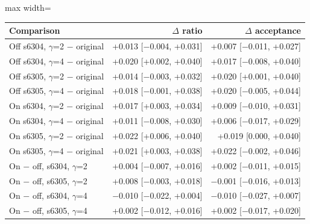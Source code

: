 \scriptsize
\setlength{\tabcolsep}{3.5pt}
\label{tab:t3boot}
\begin{adjustbox}{max width=\linewidth}
\begin{tabular}{lrr}
\toprule
Comparison & $\Delta$ ratio & $\Delta$ acceptance \\
\midrule
Off s6304, $\gamma$=2 $-$ original & +0.013 [$-$0.004, +0.031] & +0.007 [$-$0.011, +0.027] \\
Off s6304, $\gamma$=4 $-$ original & +0.020 [+0.002, +0.040] & +0.017 [$-$0.008, +0.040] \\
Off s6305, $\gamma$=2 $-$ original & +0.014 [$-$0.003, +0.032] & +0.020 [+0.001, +0.040] \\
Off s6305, $\gamma$=4 $-$ original & +0.018 [$-$0.001, +0.038] & +0.020 [$-$0.005, +0.044] \\
On s6304, $\gamma$=2 $-$ original & +0.017 [+0.003, +0.034] & +0.009 [$-$0.010, +0.031] \\
On s6304, $\gamma$=4 $-$ original & +0.011 [$-$0.008, +0.030] & +0.006 [$-$0.017, +0.029] \\
On s6305, $\gamma$=2 $-$ original & +0.022 [+0.006, +0.040] & +0.019 [0.000, +0.040] \\
On s6305, $\gamma$=4 $-$ original & +0.021 [+0.003, +0.038] & +0.022 [$-$0.002, +0.046] \\
On $-$ off, s6304, $\gamma$=2 & +0.004 [$-$0.007, +0.016] & +0.002 [$-$0.011, +0.015] \\
On $-$ off, s6305, $\gamma$=2 & +0.008 [$-$0.003, +0.018] & $-$0.001 [$-$0.016, +0.013] \\
On $-$ off, s6304, $\gamma$=4 & $-$0.010 [$-$0.022, +0.004] & $-$0.010 [$-$0.027, +0.007] \\
On $-$ off, s6305, $\gamma$=4 & +0.002 [$-$0.012, +0.016] & +0.002 [$-$0.017, +0.020] \\
\bottomrule
\end{tabular}
\end{adjustbox}

